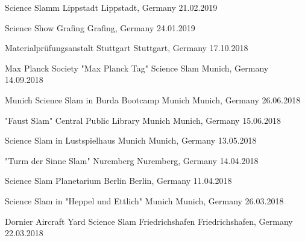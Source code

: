 \begin{cvhonors}
\cvhonor
{Science Slamm Lippstadt} %
{Lippstadt, Germany} %
{} %
{21.02.2019} %

\cvhonor
{Science Show Grafing} %
{Grafing, Germany} %
{} %
{24.01.2019} %

\cvhonor
{Materialprüfungsanstalt Stuttgart} %
{Stuttgart, Germany} %
{} %
{17.10.2018} %

\cvhonor
{Max Planck Society "Max Planck Tag" Science Slam} %
{Munich, Germany} %
{} %
{14.09.2018} %

\cvhonor
{Munich Science Slam in Burda Bootcamp Munich} %
{Munich, Germany} %
{} %
{26.06.2018} %

\cvhonor
{"Faust Slam" Central Public Library Munich} %
{Munich, Germany} %
{} %
{15.06.2018} %

\cvhonor
{Science Slam in Lustspielhaus Munich} %
{Munich, Germany} %
{} %
{13.05.2018} %

\cvhonor
{"Turm der Sinne Slam" Nuremberg} %
{Nuremberg, Germany} %
{} %
{14.04.2018} %

\cvhonor
{Science Slam Planetarium Berlin} %
{Berlin, Germany} %
{} %
{11.04.2018} %

\cvhonor
{Science Slam in "Heppel und Ettlich" Munich} %
{Munich, Germany} %
{} %
{26.03.2018} %

\cvhonor
{Dornier Aircraft Yard Science Slam Friedrichshafen} %
{Friedrichshafen, Germany} %
{} %
{22.03.2018} %


\end{cvhonors}
